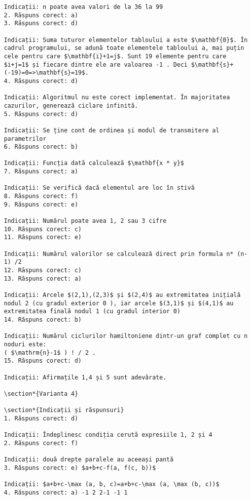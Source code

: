 \begin{verbatim}
Indicații: n poate avea valori de la 36 la 99
2. Răspuns corect: a)
3. Răspuns corect: d)

Indicații: Suma tuturor elementelor tabloului a este $\mathbf{0}$. În cadrul programului, se adună toate elementele tabloului a, mai puțin cele pentru care $\mathbf{i}+1=j$. Sunt 19 elemente pentru care $i+j=1$ și fiecare dintre ele are valoarea -1 . Deci $\mathbf{s}+(-19)=0=>\mathbf{s}=19$.
4. Răspuns corect: d)

Indicații: Algoritmul nu este corect implementat. În majoritatea cazurilor, generează ciclare infinită.
5. Răspuns corect: d)

Indicații: Se ține cont de ordinea și modul de transmitere al parametrilor
6. Răspuns corect: b)

Indicații: Funcția dată calculează $\mathbf{x * y}$
7. Răspuns corect: a)

Indicații: Se verifică dacă elementul are loc în stivă
8. Răspuns corect: f)
9. Răspuns corect: e)

Indicații: Numărul poate avea 1, 2 sau 3 cifre
10. Răspuns corect: c)
11. Răspuns corect: e)

Indicații: Numărul valorilor se calculează direct prin formula n* (n-1) /2
12. Răspuns corect: c)
13. Răspuns corect: a)

Indicații: Arcele $(2,1),(2,3)$ și $(2,4)$ au extremitatea inițială nodul 2 (cu gradul exterior 0 ), iar arcele $(3,1)$ și $(4,1)$ au extremitatea finală nodul 1 (cu gradul interior 0)
14. Răspuns corect: b)

Indicații: Numărul ciclurilor hamiltoniene dintr-un graf complet cu n noduri este:
( $\mathrm{n}-1$ ) ! / 2 .
15. Răspuns corect: d)

Indicații: Afirmațile 1,4 și 5 sunt adevărate.

\section*{Varianta 4}

\section*{Indicații și răspunsuri}
1. Răspuns corect: d)

Indicații: Îndeplinesc condiția cerută expresiile 1, 2 și 4
2. Răspuns corect: f)

Indicații: două drepte paralele au aceeași pantă
3. Răspuns corect: e) $a+b+c-f(a, f(c, b))$

Indicații: $a+b+c-\max (a, b, c)=a+b+c-\max (a, \max (b, c))$
4. Răspuns corect: a) -1 2 2-1 -1 1


\end{verbatim}
